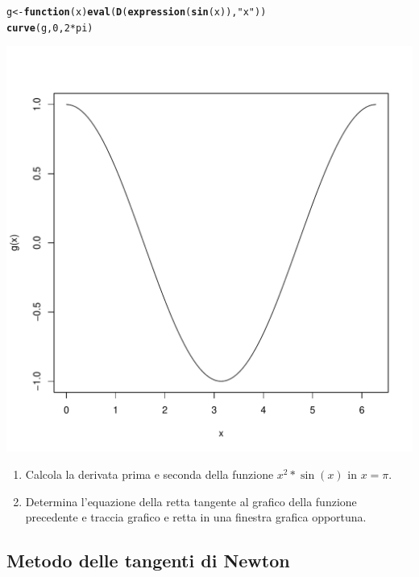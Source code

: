 \documentclass[onecolumn,11pt]{book}\usepackage[]{graphicx}\usepackage[]{color}
\makeatletter
\def\maxwidth{ %
  \ifdim\Gin@nat@width>\linewidth
    \linewidth
  \else
    \Gin@nat@width
  \fi
}
\newcommand{\hlnum}[1]{\textcolor[rgb]{0.686,0.059,0.569}{#1}}%
\newcommand{\hlstr}[1]{\textcolor[rgb]{0.192,0.494,0.8}{#1}}%
\newcommand{\hlopt}[1]{\textcolor[rgb]{0,0,0}{#1}}%
\newcommand{\hlstd}[1]{\textcolor[rgb]{0.345,0.345,0.345}{#1}}%
\newcommand{\hlkwa}[1]{\textcolor[rgb]{0.161,0.373,0.58}{\textbf{#1}}}%
\newcommand{\hlkwb}[1]{\textcolor[rgb]{0.69,0.353,0.396}{#1}}%
\newcommand{\hlkwc}[1]{\textcolor[rgb]{0.333,0.667,0.333}{#1}}%
\newcommand{\hlkwd}[1]{\textcolor[rgb]{0.737,0.353,0.396}{\textbf{#1}}}%
\newenvironment{kframe}{%
 \def\at@end@of@kframe{}%
 \ifinner\ifhmode%
  \def\at@end@of@kframe{\end{minipage}}%
  \begin{minipage}{\columnwidth}%
 \fi\fi%
 \def\FrameCommand##1{\hskip\@totalleftmargin \hskip-\fboxsep
 \colorbox{shadecolor}{##1}\hskip-\fboxsep
     \hskip-\linewidth \hskip-\@totalleftmargin \hskip\columnwidth}%
 \MakeFramed {\advance\hsize-\width
   \@totalleftmargin\z@ \linewidth\hsize
   \@setminipage}}%
 {\par\unskip\endMakeFramed%
 \at@end@of@kframe}
\newenvironment{knitrout}{}{} %
\makeatother
\begin{document}
\begin{knitrout}
\color{fgcolor}\begin{kframe}
\begin{alltt}
\hlstd{g}\hlkwb{<-}\hlkwa{function}\hlstd{(}\hlkwc{x}\hlstd{)} \hlkwd{eval}\hlstd{(}\hlkwd{D}\hlstd{(}\hlkwd{expression}\hlstd{(}\hlkwd{sin}\hlstd{(x)),}\hlstr{"x"}\hlstd{))}
\hlkwd{curve}\hlstd{(g,}\hlnum{0}\hlstd{,}\hlnum{2}\hlopt{*}\hlstd{pi)}
\end{alltt}
\end{kframe}
\includegraphics[width=\maxwidth]{figure/unnamed-chunk-131-1} 

\end{knitrout}
\begin{shaded}
\begin{enumerate}
 \item{} Calcola la derivata prima e seconda della funzione $x^2*\sin(x)$ in $x=\pi$.
 \item{} Determina l'equazione della retta tangente al grafico della funzione precedente e traccia grafico e retta in una finestra grafica opportuna.
\end{enumerate}
\end{shaded}
 \subsection{Metodo delle tangenti di Newton}
\end{document}
